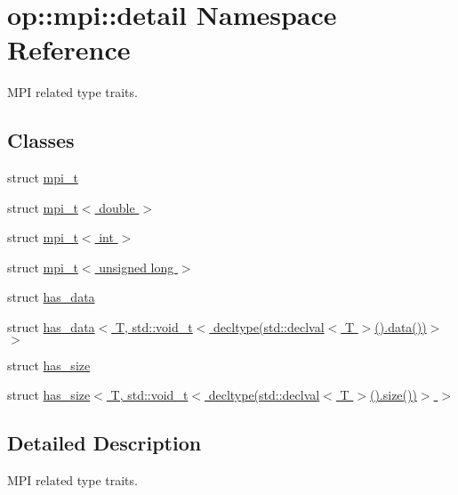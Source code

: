 \hypertarget{namespaceop_1_1mpi_1_1detail}{\section{op\-:\-:mpi\-:\-:detail Namespace Reference}
\label{namespaceop_1_1mpi_1_1detail}
}


M\-P\-I related type traits.  


\subsection*{Classes}
\begin{DoxyCompactItemize}
\item 
struct \hyperlink{structop_1_1mpi_1_1detail_1_1mpi__t}{mpi\-\_\-t}
\item 
struct \hyperlink{structop_1_1mpi_1_1detail_1_1mpi__t_3_01double_01_4}{mpi\-\_\-t$<$ double $>$}
\item 
struct \hyperlink{structop_1_1mpi_1_1detail_1_1mpi__t_3_01int_01_4}{mpi\-\_\-t$<$ int $>$}
\item 
struct \hyperlink{structop_1_1mpi_1_1detail_1_1mpi__t_3_01unsigned_01long_01_4}{mpi\-\_\-t$<$ unsigned long $>$}
\item 
struct \hyperlink{structop_1_1mpi_1_1detail_1_1has__data}{has\-\_\-data}
\item 
struct \hyperlink{structop_1_1mpi_1_1detail_1_1has__data_3_01T_00_01std_1_1void__t_3_01decltype_07std_1_1declval_3524e889c05cc305ced759fca9c8b2769}{has\-\_\-data$<$ T, std\-::void\-\_\-t$<$ decltype(std\-::declval$<$ T $>$().\-data())$>$ $>$}
\item 
struct \hyperlink{structop_1_1mpi_1_1detail_1_1has__size}{has\-\_\-size}
\item 
struct \hyperlink{structop_1_1mpi_1_1detail_1_1has__size_3_01T_00_01std_1_1void__t_3_01decltype_07std_1_1declval_336d4e0461dc0efc09f20739ab7700530}{has\-\_\-size$<$ T, std\-::void\-\_\-t$<$ decltype(std\-::declval$<$ T $>$().\-size())$>$ $>$}
\end{DoxyCompactItemize}


\subsection{Detailed Description}
M\-P\-I related type traits. 
